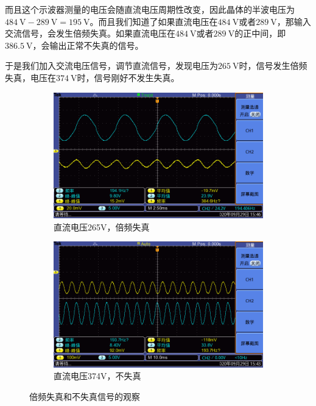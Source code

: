 \documentclass{ctexart}
\newcommand{\si}[1]{\  \mathrm{#1}}
\begin{document}
而且这个示波器测量的电压会随直流电压周期性改变，因此晶体的半波电压为$484 \si{V} - 289 \si{V} = 195 \si{V}$。而且我们知道了如果直流电压在$484 \si{V}$或者$289 \si{V}$，那输入交流信号，会发生倍频失真。如果直流电压在$484 \si{V}$或者$289 \si{V}$的正中间，即$386.5 \si{V}$，会输出正常不失真的信号。

于是我们加入交流电压信号，调节直流信号，发现电压为$265 \si{V}$时，信号发生倍频失真，电压在$374 \si{V}$时，信号刚好不发生失真。

\begin{figure}[H]
  \centering
  \begin{subfigure}{.48\textwidth}
    \centering
    \includegraphics[width=\linewidth]{晶体电光调制图像/没有波片/倍频失真265V/F0000TEK}
    \caption{直流电压265V，倍频失真}
  \end{subfigure}
  \begin{subfigure}{.48\textwidth}
    \centering
    \includegraphics[width=\linewidth]{晶体电光调制图像/没有波片/正弦信号输入偏置374V/F0001TEK}
    \caption{直流电压374V，不失真}
  \end{subfigure}
  \caption{倍频失真和不失真信号的观察}
\end{figure}
\end{document}
